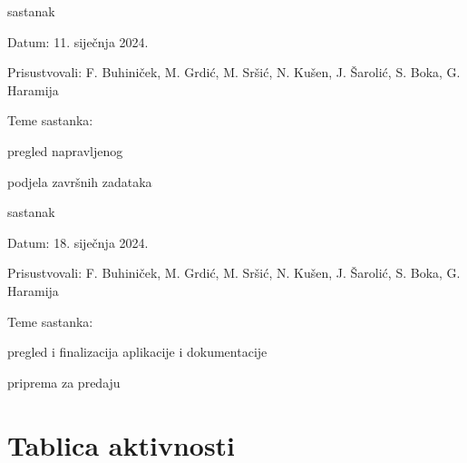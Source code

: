 \begin{packed_enum}
			\item  sastanak
			\item[] \begin{packed_item}
				\item Datum: 11. siječnja 2024.
				\item Prisustvovali: F. Buhiniček, M. Grdić, M. Sršić, N. Kušen, J. Šarolić, S. Boka, G. Haramija
				\item Teme sastanka:
				\begin{packed_item}
					\item  pregled napravljenog
					\item podjela završnih zadataka
				\end{packed_item}
			\end{packed_item}
			
			\item  sastanak
			\item[] \begin{packed_item}
				\item Datum: 18. siječnja 2024.
				\item Prisustvovali: F. Buhiniček, M. Grdić, M. Sršić, N. Kušen, J. Šarolić, S. Boka, G. Haramija
				\item Teme sastanka:
				\begin{packed_item}
					\item  pregled i finalizacija aplikacije i dokumentacije
					\item priprema za predaju
				\end{packed_item}
			\end{packed_item}
			
		\end{packed_enum}
		
		\eject
		\section*{Tablica aktivnosti}
		

